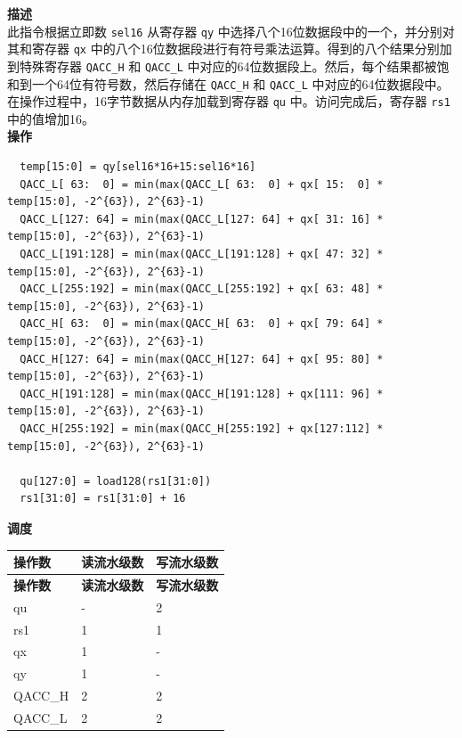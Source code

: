 \textbf{描述}\\
此指令根据立即数 \lstinline{sel16} 从寄存器 \lstinline{qy} 中选择八个16位数据段中的一个，并分别对其和寄存器 \lstinline{qx} 中的八个16位数据段进行有符号乘法运算。得到的八个结果分别加到特殊寄存器 \lstinline{QACC_H} 和 \lstinline{QACC_L} 中对应的64位数据段上。然后，每个结果都被饱和到一个64位有符号数，然后存储在 \lstinline{QACC_H} 和 \lstinline{QACC_L} 中对应的64位数据段中。\\
在操作过程中，16字节数据从内存加载到寄存器 \lstinline{qu} 中。访问完成后，寄存器 \lstinline{rs1} 中的值增加16。\\
\textbf{操作}
\begin{lstlisting}
  temp[15:0] = qy[sel16*16+15:sel16*16]
  QACC_L[ 63:  0] = min(max(QACC_L[ 63:  0] + qx[ 15:  0] * temp[15:0], -2^{63}), 2^{63}-1)
  QACC_L[127: 64] = min(max(QACC_L[127: 64] + qx[ 31: 16] * temp[15:0], -2^{63}), 2^{63}-1)
  QACC_L[191:128] = min(max(QACC_L[191:128] + qx[ 47: 32] * temp[15:0], -2^{63}), 2^{63}-1)
  QACC_L[255:192] = min(max(QACC_L[255:192] + qx[ 63: 48] * temp[15:0], -2^{63}), 2^{63}-1)
  QACC_H[ 63:  0] = min(max(QACC_H[ 63:  0] + qx[ 79: 64] * temp[15:0], -2^{63}), 2^{63}-1)
  QACC_H[127: 64] = min(max(QACC_H[127: 64] + qx[ 95: 80] * temp[15:0], -2^{63}), 2^{63}-1)
  QACC_H[191:128] = min(max(QACC_H[191:128] + qx[111: 96] * temp[15:0], -2^{63}), 2^{63}-1)
  QACC_H[255:192] = min(max(QACC_H[255:192] + qx[127:112] * temp[15:0], -2^{63}), 2^{63}-1)

  qu[127:0] = load128(rs1[31:0])
  rs1[31:0] = rs1[31:0] + 16
\end{lstlisting}

\textbf{调度}\\
\begin{longtable}[c]{|l|l|l|}
    \hline
    \rowcolor{lightgray}
    \textbf{操作数} & \textbf{读流水级数} & \textbf{写流水级数} \\\hline
    \endfirsthead
    \hline
    \rowcolor{lightgray}
     \textbf{操作数} & \textbf{读流水级数} & \textbf{写流水级数} \\\hline
    \endhead
    \hline
    \endfoot

    qu & - & 2 \\\hline
    rs1 & 1 & 1 \\\hline
     qx & 1 & - \\\hline
     qy & 1 & - \\\hline
     QACC\_H & 2 & 2 \\\hline
     QACC\_L & 2 & 2

\end{longtable}

